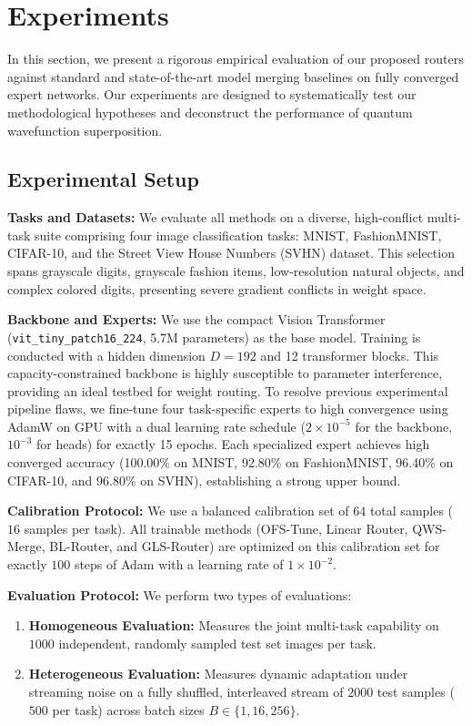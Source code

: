 \section{Experiments}
\label{sec:experiments}

In this section, we present a rigorous empirical evaluation of our proposed routers against standard and state-of-the-art model merging baselines on fully converged expert networks. Our experiments are designed to systematically test our methodological hypotheses and deconstruct the performance of quantum wavefunction superposition.

\subsection{Experimental Setup}
\textbf{Tasks and Datasets:} We evaluate all methods on a diverse, high-conflict multi-task suite comprising four image classification tasks: MNIST, FashionMNIST, CIFAR-10, and the Street View House Numbers (SVHN) dataset. This selection spans grayscale digits, grayscale fashion items, low-resolution natural objects, and complex colored digits, presenting severe gradient conflicts in weight space.

\textbf{Backbone and Experts:} We use the compact Vision Transformer (\texttt{vit\_tiny\_patch16\_224}, 5.7M parameters) as the base model. Training is conducted with a hidden dimension $D = 192$ and 12 transformer blocks. This capacity-constrained backbone is highly susceptible to parameter interference, providing an ideal testbed for weight routing. To resolve previous experimental pipeline flaws, we fine-tune four task-specific experts to high convergence using AdamW on GPU with a dual learning rate schedule ($2\times 10^{-5}$ for the backbone, $10^{-3}$ for heads) for exactly 15 epochs. Each specialized expert achieves high converged accuracy (100.00\% on MNIST, 92.80\% on FashionMNIST, 96.40\% on CIFAR-10, and 96.80\% on SVHN), establishing a strong upper bound.

\textbf{Calibration Protocol:} We use a balanced calibration set of $64$ total samples ($16$ samples per task). All trainable methods (OFS-Tune, Linear Router, QWS-Merge, BL-Router, and GLS-Router) are optimized on this calibration set for exactly $100$ steps of Adam with a learning rate of $1\times 10^{-2}$.

\textbf{Evaluation Protocol:} We perform two types of evaluations:
\begin{enumerate}
    \item \textbf{Homogeneous Evaluation:} Measures the joint multi-task capability on $1000$ independent, randomly sampled test set images per task.
    \item \textbf{Heterogeneous Evaluation:} Measures dynamic adaptation under streaming noise on a fully shuffled, interleaved stream of $2000$ test samples ($500$ per task) across batch sizes $B \in \{1, 16, 256\}$.
\end{enumerate}

